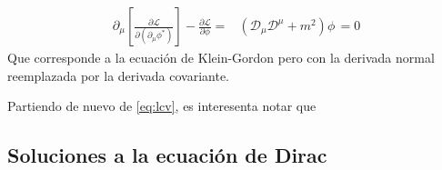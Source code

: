 \begin{align}
  \partial_{\mu} \left[ \frac{\partial \mathcal{L}}{\partial \left( \partial_{\mu}\phi^{*} \right)} \right]-\frac{\partial \mathcal{L}}{\partial \phi}=&
 \left(\mathcal{D}_{\mu}\mathcal{D}^{\mu}+m^2  \right)\phi\,=0
\end{align}
Que corresponde a la ecuación de Klein-Gordon pero con la derivada normal reemplazada por la derivada covariante.

Partiendo de nuevo de \ref{eq:lcv}, es interesenta notar que


\begin{subappendices}
\section{Soluciones a la ecuaci\'on de Dirac}
\label{sec:soluc-la-ecuac}


\end{subappendices}
